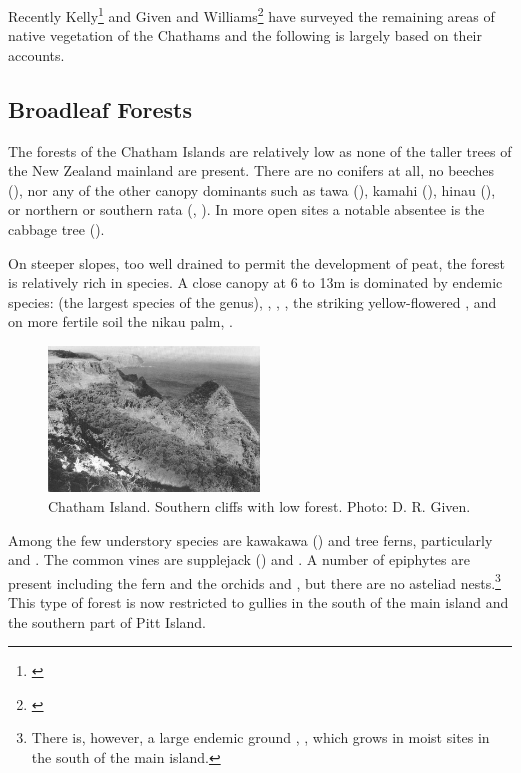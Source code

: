 Recently Kelly\footnote{\cite{kelly1983distribution}} and Given and Williams\footnote{\cite{given1984conservation}} have surveyed the remaining areas of native vegetation of the Chathams and the following is largely based on their accounts.

\subsection{Broadleaf Forests}

The forests of the Chatham Islands are relatively low as none of the taller trees of the New Zealand mainland are present.
There are no conifers at all, no beeches (), nor any of the other canopy dominants such as tawa (), kamahi (), hinau (), or northern or southern rata (, ).
In more open sites a notable absentee is the cabbage tree ().

On steeper slopes, too well drained to permit the development of peat, the forest is relatively rich in species.
A close canopy at 6 to 13m is dominated by endemic species:  (the largest species of the genus), , , , the striking yellow-flowered , and on more fertile soil the nikau palm, .

\begin{figure}
	\includegraphics[width=0.5\textwidth]{graphics/figure118chatham-island.jpg}
	\centering
	\caption[Chatham Island, southern cliffs]{Chatham Island.
	Southern cliffs with low forest.
	Photo: D. R. Given.}%
	\label{fig:118chatham-island}
\end{figure}

Among the few understory species are kawakawa () and tree ferns, particularly  and .
The common vines are supplejack () and .
A number of epiphytes are present including the fern  and the orchids  and , but there are no asteliad nests.\footnote{There is, however, a large endemic ground , , which grows in moist sites in the south of the main island.}
This type of forest is now restricted to gullies in the south of the main island and the southern part of Pitt Island.

